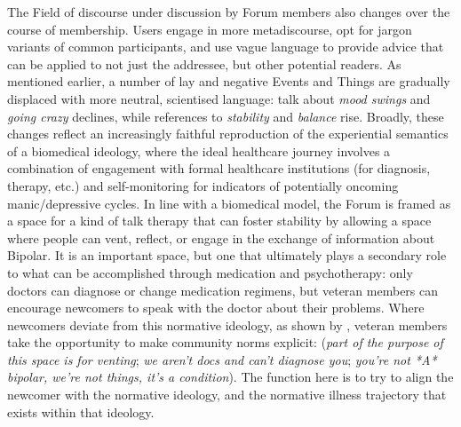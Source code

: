 The Field of discourse under discussion by \gls{Forum} \glspl{member} also changes over the course of membership. Users engage in more metadiscourse, opt for jargon variants of common participants, and use vague language to provide advice that can be applied to not just the addressee, but other potential readers. As mentioned earlier, a number of lay and negative Events and Things are gradually displaced with more neutral, scientised language: talk about \emph{mood swings} and \emph{going crazy} declines, while references to \emph{stability} and \emph{balance} rise. Broadly, these changes reflect an increasingly faithful reproduction of the experiential semantics of a biomedical ideology, where the ideal healthcare journey involves a combination of engagement with formal healthcare institutions (for diagnosis, therapy, etc.) and self-monitoring for indicators of potentially oncoming manic\slash depressive cycles. In line with a biomedical model, the \gls{Forum} is framed as a space for a kind of talk therapy that can foster stability by allowing a space where people can vent, reflect, or engage in the exchange of information about Bipolar. It is an important space, but one that ultimately plays a secondary role to what can be accomplished through medication and psychotherapy: only doctors can diagnose or change medication regimens, but veteran \glspl{member} can encourage newcomers to speak with the doctor about their problems. Where newcomers deviate from this normative ideology, as shown by \textcite{weber_missed_2011}, veteran \glspl{member} take the opportunity to make community norms explicit: (\emph{part of the purpose of this space is for venting}; \emph{we aren't docs and can't diagnose you}; \emph{you're not *A* bipolar, we're not things, it's a condition}). The function here is to try to align the newcomer with the normative ideology, and the normative illness trajectory that exists within that ideology.

